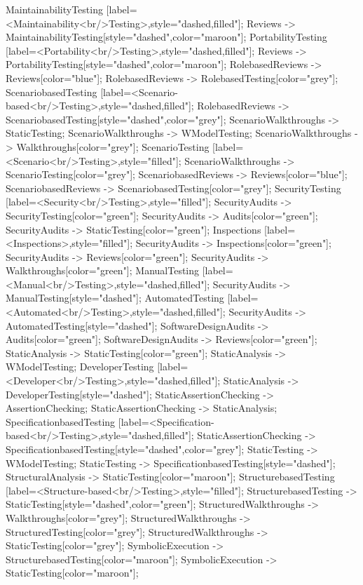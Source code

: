\documentclass{article}
\begin{document}
{MaintainabilityTesting [label=<Maintainability<br/>Testing>,style="dashed,filled"];
Reviews -> MaintainabilityTesting[style="dashed",color="maroon"];
PortabilityTesting [label=<Portability<br/>Testing>,style="dashed,filled"];
Reviews -> PortabilityTesting[style="dashed",color="maroon"];
RolebasedReviews -> Reviews[color="blue"];
RolebasedReviews -> RolebasedTesting[color="grey"];
ScenariobasedTesting [label=<Scenario-based<br/>Testing>,style="dashed,filled"];
RolebasedReviews -> ScenariobasedTesting[style="dashed",color="grey"];
ScenarioWalkthroughs -> StaticTesting;
ScenarioWalkthroughs -> WModelTesting;
ScenarioWalkthroughs -> Walkthroughs[color="grey"];
ScenarioTesting [label=<Scenario<br/>Testing>,style="filled"];
ScenarioWalkthroughs -> ScenarioTesting[color="grey"];
ScenariobasedReviews -> Reviews[color="blue"];
ScenariobasedReviews -> ScenariobasedTesting[color="grey"];
SecurityTesting [label=<Security<br/>Testing>,style="filled"];
SecurityAudits -> SecurityTesting[color="green"];
SecurityAudits -> Audits[color="green"];
SecurityAudits -> StaticTesting[color="green"];
Inspections [label=<Inspections>,style="filled"];
SecurityAudits -> Inspections[color="green"];
SecurityAudits -> Reviews[color="green"];
SecurityAudits -> Walkthroughs[color="green"];
ManualTesting [label=<Manual<br/>Testing>,style="dashed,filled"];
SecurityAudits -> ManualTesting[style="dashed"];
AutomatedTesting [label=<Automated<br/>Testing>,style="dashed,filled"];
SecurityAudits -> AutomatedTesting[style="dashed"];
SoftwareDesignAudits -> Audits[color="green"];
SoftwareDesignAudits -> Reviews[color="green"];
StaticAnalysis -> StaticTesting[color="green"];
StaticAnalysis -> WModelTesting;
DeveloperTesting [label=<Developer<br/>Testing>,style="dashed,filled"];
StaticAnalysis -> DeveloperTesting[style="dashed"];
StaticAssertionChecking -> AssertionChecking;
StaticAssertionChecking -> StaticAnalysis;
SpecificationbasedTesting [label=<Specification-based<br/>Testing>,style="dashed,filled"];
StaticAssertionChecking -> SpecificationbasedTesting[style="dashed",color="grey"];
StaticTesting -> WModelTesting;
StaticTesting -> SpecificationbasedTesting[style="dashed"];
StructuralAnalysis -> StaticTesting[color="maroon"];
StructurebasedTesting [label=<Structure-based<br/>Testing>,style="filled"];
StructurebasedTesting -> StaticTesting[style="dashed",color="green"];
StructuredWalkthroughs -> Walkthroughs[color="grey"];
StructuredWalkthroughs -> StructuredTesting[color="grey"];
StructuredWalkthroughs -> StaticTesting[color="grey"];
SymbolicExecution -> StructurebasedTesting[color="maroon"];
SymbolicExecution -> StaticTesting[color="maroon"];
}
\end{document}
